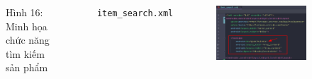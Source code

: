 \documentclass{beamer}
\begin{document}
\begin{frame}
\begin{columns}
\begin{figure}
            \caption{\centering\tiny{Hình 16: Minh họa chức năng tìm kiếm sản phẩm}}
        \end{figure}
        \indent \texttt{item\_search.xml}
        \begin{figure}
            \centering
            \includegraphics[width=\textwidth]{images/45.png}
        \end{figure}
    \end{columns}
\end{frame}
\end{document}
